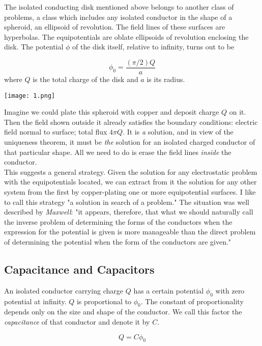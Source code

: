\documentclass[svgnames]{article}
\begin{document}
The isolated conducting disk mentioned above belongs to another class of
problems, a class which includes any isolated conductor in the shape of
a spheroid, an ellipsoid of revolution. The field lines of these surfaces are
hyperbolas. The equipotentials are oblate ellipsoids of revolution enclosing
the disk. The potential $\phi$ of the disk itself, relative to infinity, turns
out to be 

\[
\phi_0 = \frac{(\pi / 2) Q}{a} 
\] 
where $Q$ is the total charge of the disk and $a$ is its radius. 

\begin{center}
\texttt{[image: 1.png]}
\end{center}

Imagine we could plate this spheroid with copper and deposit charge $Q$ on it.
Then the field shown outside it already satisfies the boundary conditions:
electric field normal to surface; total flux $4 \pi Q$. It is \textit{a}
solution, and in view of the uniqueness theorem, it must be \textit{the}
solution for an isolated charged conductor of that particular shape. All we
need to do is erase the field lines \textit{inside} the conductor. \\

This suggests a general strategy. Given the solution for any electrostatic
problem with the equipotentials located, we can extract from it the solution
for any other system from the first by copper-plating one or more
equipotential surfaces. I like to call this strategy "a solution in search 
of a problem." The situation was well described by \textit{Maxwell}: "it 
appears, therefore, that what we should naturally call the inverse problem 
of determining the forms of the conductors when the expression for the 
potential is given is more manageable than the direct problem of 
determining the potential when the form of the conductors are given." 

\subsection{Capacitance and Capacitors}

An isolated conductor carrying charge $Q$ has a certain potential $\phi_0$ with
zero potential at infinity. $Q$ is proportional to $\phi_0$. The constant of
proportionality depends only on the size and shape of the conductor. We call
this factor the \textit{capacitance} of that conductor and denote it by $C$.

\[
Q = C\phi_0
\] 
\end{document}

